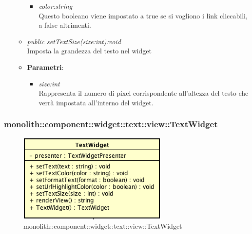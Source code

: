 \begin{itemize}
\begin{itemize}
{\begin{itemize}
		\item \textit{color:string}\\
		Questo booleano viene impostato a true se si vogliono i link cliccabili, a false altrimenti.
		\end{itemize}}
	\item \textit{public setTextSize(size:int):void}\\
	Imposta la grandezza del testo nel widget
		\item{\textbf{Parametri}: \begin{itemize}
		\item \textit{size:int}\\
		Rappresenta il numero di pixel corrispondente all'altezza del testo che verrà impostata all'interno del widget.
		\end{itemize}}
	\end{itemize}
\end{itemize}

\subsubsection{monolith::component::widget::text::view::TextWidget}

\label{monolith::component::widget::text::view::TextWidget}
\begin{figure}[ht]
	\centering
	\includegraphics[scale=0.5]{Sezioni/SottosezioniST/img/TextWidget.png}
	\caption{monolith::component::widget::text::view::TextWidget}
\end{figure}

